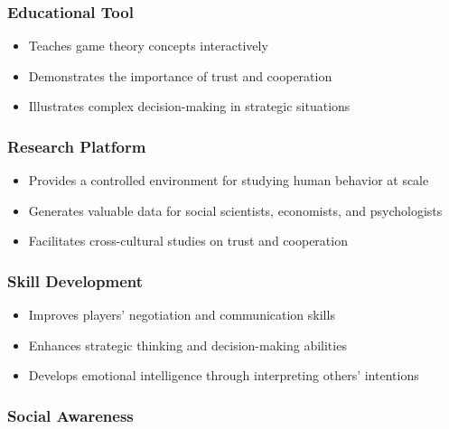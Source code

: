 \documentclass[]{article}
\begin{document}
\hypertarget{educational-tool}{%
\subsubsection{Educational Tool}\label{educational-tool}}

\begin{itemize}
\tightlist
\item
  Teaches game theory concepts interactively
\item
  Demonstrates the importance of trust and cooperation
\item
  Illustrates complex decision-making in strategic situations
\end{itemize}

\hypertarget{research-platform}{%
\subsubsection{Research Platform}\label{research-platform}}

\begin{itemize}
\tightlist
\item
  Provides a controlled environment for studying human behavior at scale
\item
  Generates valuable data for social scientists, economists, and
  psychologists
\item
  Facilitates cross-cultural studies on trust and cooperation
\end{itemize}

\hypertarget{skill-development}{%
\subsubsection{Skill Development}\label{skill-development}}

\begin{itemize}
\tightlist
\item
  Improves players' negotiation and communication skills
\item
  Enhances strategic thinking and decision-making abilities
\item
  Develops emotional intelligence through interpreting others'
  intentions
\end{itemize}

\hypertarget{social-awareness}{%
\subsubsection{Social Awareness}\label{social-awareness}}
\end{document}
